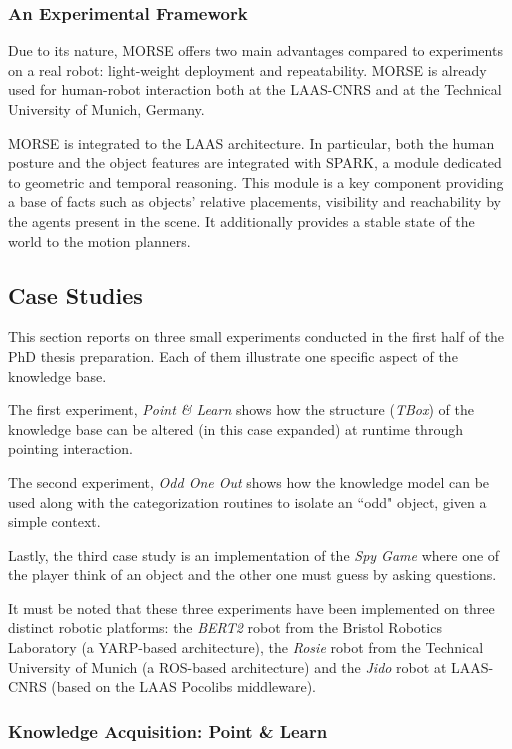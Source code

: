 \subsubsection{An Experimental Framework}

Due to its nature, MORSE offers two main advantages compared to experiments on
a real robot: light-weight deployment and repeatability. MORSE is already used
for human-robot interaction both at the LAAS-CNRS and at the Technical
University of Munich, Germany.

MORSE is integrated to the LAAS architecture.  In particular, both the human
posture and the object features are integrated with SPARK, a
module dedicated to geometric and temporal reasoning.  This module is a key
component providing a base of facts such as objects' relative placements,
visibility and reachability by the agents present in the scene. It additionally
provides a stable state of the world to the motion planners.

\subsection{Case Studies}
\label{sect|casestudies}

This section reports on three small experiments conducted in the first half of
the PhD thesis preparation. Each of them illustrate one specific aspect of the
knowledge base.

The first experiment, \emph{Point \& Learn} shows how the structure
(\emph{TBox}) of the knowledge base can be altered (in this case expanded) at
runtime through pointing interaction.

The second experiment, \emph{Odd One Out} shows how the knowledge model can be
used along with the categorization routines to isolate an ``odd" object, given
a simple context.

Lastly, the third case study is an implementation of the \emph{Spy Game} where
one of the player think of an object and the other one must guess by asking
questions.

It must be noted that these three experiments have been implemented on three
distinct robotic platforms: the \textit{BERT2} robot from the Bristol Robotics
Laboratory (a YARP-based architecture), the \textit{Rosie} robot from the
Technical University of Munich (a ROS-based architecture) and the \textit{Jido}
robot at LAAS-CNRS (based on the LAAS Pocolibs middleware).

\subsubsection{Knowledge Acquisition: Point \& Learn}
\label{expe|pointandlearn}

